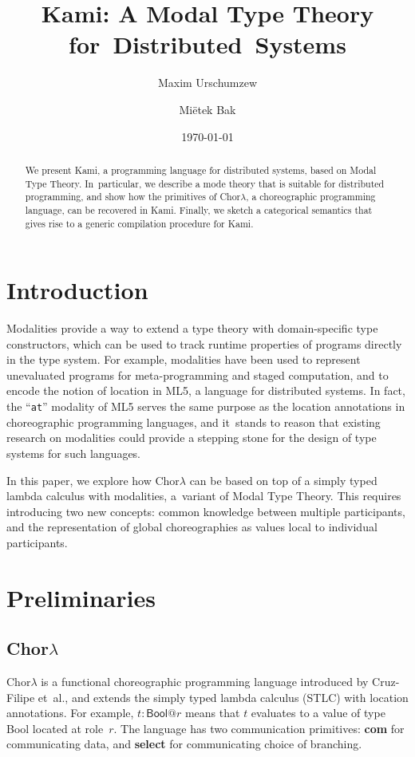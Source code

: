 \documentclass{scrartcl}
\title{Kami: A Modal Type Theory for~Distributed~Systems}
\author{
  Maxim Urschumzew
  \emailhref{mxmurw@determi.io}
  \and
  Miëtek Bak
  \emailhref{mietek@bak.io}
}
\date{\today}
\theoremstyle{definition}
\theoremstyle{plain}
\newcommand{\primitive}[1]{\textsf{\textbf{#1}}}
\begin{document}
\maketitle
\begin{abstract}
  \noindent
  We present Kami, a programming language for distributed systems, based on
  Modal Type Theory. In~particular, we describe a mode theory that is suitable
  for distributed programming, and show how the primitives of Chor$\lambda$, a
  choreographic programming language, can be recovered in Kami. Finally, we
  sketch a categorical semantics that gives rise to a generic compilation
  procedure for Kami.
\end{abstract}



\section{Introduction}
Modalities provide a way to extend a type theory with domain-specific type
constructors, which can be used to track runtime properties of programs
directly in the type system. For example, modalities have been used to
represent unevaluated programs for meta-programming\cite{bak2020self} and
staged computation\cite{davies2001modal}, and to encode the notion of location
in ML5, a language for distributed systems\cite{murphy2008modal}. In fact, the
``\texttt{at}'' modality of ML5 serves the same purpose as the location
annotations in choreographic programming languages\cite{giallorenzo2024choral},
and it~stands to reason that existing research on modalities could provide a
stepping stone for the design of type systems for such languages.

In this paper, we explore how Chor$\lambda$ can be based on top of a simply
typed lambda calculus with modalities, a~variant of Modal Type Theory. This
requires introducing two new concepts: common knowledge between multiple
participants, and the representation of global choreographies as values local
to individual participants.



\section{Preliminaries}
\subsection{\texorpdfstring{Chor$\lambda$}{ChorLambda}}
Chor$\lambda$ is a functional choreographic programming language introduced by
Cruz-Filipe et~al.\cite{cruz2022functional}, and extends the simply typed
lambda calculus (STLC) with location annotations. For example, $t :
\textsf{Bool} @r$ means that $t$ evaluates to a value of type \textsf{Bool}
located at role~$r$. The language has two communication primitives:
\primitive{com} for communicating data, and \primitive{select} for
communicating choice of branching.
\end{document}
